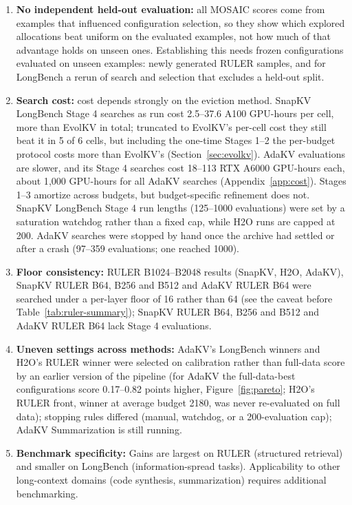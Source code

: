 \documentclass[11pt]{article}
\begin{document}
\begin{enumerate}
\item \textbf{No independent held-out evaluation:} all MOSAIC scores come from examples that influenced configuration selection, so they show which explored allocations beat uniform on the evaluated examples, not how much of that advantage holds on unseen ones. Establishing this needs frozen configurations evaluated on unseen examples: newly generated RULER samples, and for LongBench a rerun of search and selection that excludes a held-out split.
\item \textbf{Search cost:} cost depends strongly on the eviction method. SnapKV LongBench Stage 4 searches as run cost 2.5--37.6 A100 GPU-hours per cell, more than EvolKV in total; truncated to EvolKV's per-cell cost they still beat it in 5 of 6 cells, but including the one-time Stages 1--2 the per-budget protocol costs more than EvolKV's (Section~\ref{sec:evolkv}). AdaKV evaluations are slower, and its Stage 4 searches cost 18--113 RTX A6000 GPU-hours each, about 1{,}000 GPU-hours for all AdaKV searches (Appendix~\ref{app:cost}). Stages 1--3 amortize across budgets, but budget-specific refinement does not. SnapKV LongBench Stage 4 run lengths (125--1000 evaluations) were set by a saturation watchdog rather than a fixed cap, while H2O runs are capped at 200. AdaKV searches were stopped by hand once the archive had settled or after a crash (97--359 evaluations; one reached 1000).
\item \textbf{Floor consistency:} RULER B1024--B2048 results (SnapKV, H2O, AdaKV), SnapKV RULER B64, B256 and B512 and AdaKV RULER B64 were searched under a per-layer floor of 16 rather than 64 (see the caveat before Table~\ref{tab:ruler-summary}); SnapKV RULER B64, B256 and B512 and AdaKV RULER B64 lack Stage 4 evaluations.
\item \textbf{Uneven settings across methods:} AdaKV's LongBench winners and H2O's RULER winner were selected on calibration rather than full-data score by an earlier version of the pipeline (for AdaKV the full-data-best configurations score 0.17--0.82 points higher, Figure~\ref{fig:pareto}; H2O's RULER front, winner at average budget 2180, was never re-evaluated on full data); stopping rules differed (manual, watchdog, or a 200-evaluation cap); AdaKV Summarization is still running.
\item \textbf{Benchmark specificity:} Gains are largest on RULER (structured retrieval) and smaller on LongBench (information-spread tasks). Applicability to other long-context domains (code synthesis, summarization) requires additional benchmarking.

\end{enumerate}
\end{document}
